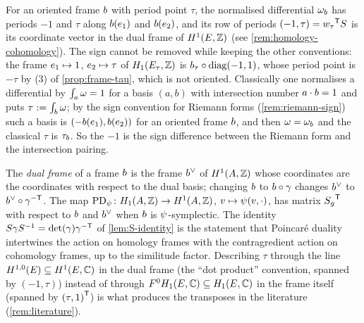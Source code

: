 \begin{remark}\label{rem:minus-one}
For an oriented frame $b$ with period point $\tau$, the normalised
differential $\omega_{b}$ has periods $-1$ and $\tau$ along
$b(e_{1})$ and $b(e_{2})$, and its row of periods
$(-1, \tau) = {w_{\tau}}^{\mathsf{T}}S$ is its coordinate vector
in the dual frame of $H^{1}(E,\mathbb{Z})$ (see \cref{rem:homology-cohomology}).
The sign cannot be removed while keeping the other conventions: the frame
$e_{1} \mapsto 1$, $e_{2} \mapsto \tau$ of
$H_{1}(E_{\tau},\mathbb{Z})$ is $b_{\tau}\circ\mathrm{diag}(-1,1)$,
whose period point is $-\tau$ by (3) of \cref{prop:frame-tau}, which is not
oriented. Classically one normalises a differential by
$\int_{a}\omega = 1$ for a basis $(a, b)$ with intersection number
$a\cdot b = 1$ and puts $\tau := \int_{b}\omega$;
by the sign convention for Riemann forms (\cref{rem:riemann-sign}) such a
basis is $(-b(e_{1}), b(e_{2}))$ for an oriented
frame $b$, and then $\omega = \omega_{b}$ and the
classical $\tau$ is $\tau_{b}$. So the $-1$ is the sign
difference between the Riemann form and the intersection pairing.
\end{remark}

\begin{remark}\label{rem:homology-cohomology}
The \emph{dual frame} of a frame $b$ is the frame
$b^{\vee}$ of $H^{1}(A,\mathbb{Z})$ whose coordinates are the
coordinates with respect to the dual basis; changing $b$ to
$b\circ\gamma$ changes $b^{\vee}$ to
$b^{\vee}\circ{\gamma}^{-\mathsf{T}}$. The map
$\mathrm{PD}_{\psi_{}} \colon H_{1}(A,\mathbb{Z}) \to H^{1}(A,\mathbb{Z})$,
$v \mapsto \psi_{}(v, \cdot)$, has matrix ${S_{g}}^{\mathsf{T}}$
with respect to $b$ and $b^{\vee}$ when $b$ is
$\psi_{}$-symplectic. The identity
$S\gamma S^{-1} = \det(\gamma){\gamma}^{-\mathsf{T}}$ of
\cref{lem:S-identity} is the statement that Poincar\'e duality intertwines
the action on homology frames with the contragredient action on cohomology
frames, up to the similitude factor. Describing $\tau$ through the line
$H^{1,0}(E) \subseteq H^{1}(E,\mathbb{C})$ in the dual frame (the ``dot
product'' convention, spanned by $(-1, \tau)$) instead of through
$F^{0}H_{1}(E,\mathbb{C}) \subseteq H_{1}(E,\mathbb{C})$ in the frame itself
(spanned by ${(\tau, 1)}^{\mathsf{T}}$) is what produces the transposes in the
literature (\cref{rem:literature}).
\end{remark}

